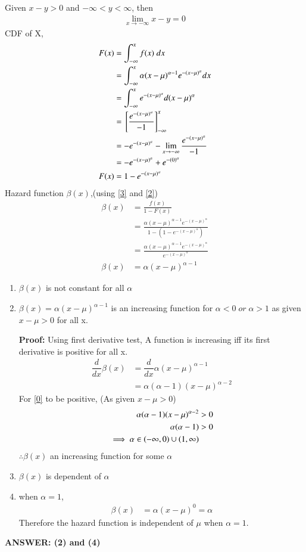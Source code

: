 \documentclass[journal,12pt,twocolumn]{IEEEtran}
\begin{document}
Given $x-y>0$ and $-\infty<y<\infty$, then
\begin{align}
    \lim_{x \to -\infty} x-y=0
\end{align}
CDF of X,
\begin{align}
    F(x)&=\int_{-\infty}^x{f(x)\;dx}\\
    &=\int_{-\infty}^x{\alpha(x-\mu)^{\alpha-1}e^{-(x-\mu)^{\alpha}}dx}\\
    &=\int_{-\infty}^x{e^{-(x-\mu)^{\alpha}}d(x-\mu)^{\alpha}}\\
    &={}\left[\frac{e^{-(x-\mu)^{\alpha}}}{-1}\right]_{-\infty}^x\\
    &=-e^{-(x-\mu)^{\alpha}}-\lim_{x \to -\infty} \frac{e^{-(x-\mu)^{\alpha}}}{-1}\label{1}\\
    &=-e^{-(x-\mu)^{\alpha}}+ {e^{-(0)^{\alpha}}}\\
   F(x) &=1-e^{-(x-\mu)^{\alpha}}\label{2}
\end{align}
Hazard function $\beta(x)$,(using \eqref{3} and \eqref{2})
\begin{align}
    \beta(x)&=\frac{f(x)}{1-F(x)}\\
    &=\frac{\alpha(x-\mu)^{\alpha-1}e^{-(x-\mu)^{\alpha}}}{1-(1-e^{-(x-\mu)^{\alpha}})}\\
    &=\frac{\alpha(x-\mu)^{\alpha-1}e^{-(x-\mu)^{\alpha}}}{e^{-(x-\mu)^{\alpha}}}\\
    \beta(x)&=\alpha(x-\mu)^{\alpha-1}
\end{align}
\begin{enumerate}
    \item $\beta(x)$ is not constant for all $\alpha$
    \item $\beta(x)=\alpha(x-\mu)^{\alpha-1}$ is an increasing function for $\alpha<0 \;or\; \alpha>1$ as given $x-\mu>0$ for all x.
    
    \textbf{Proof: }
    Using first derivative test, A function is increasing iff its first derivative is positive for all x. 
    \begin{align}
        \dfrac{d}{dx} \beta(x)&=  \dfrac{d}{dx} \alpha(x-\mu)^{\alpha-1}\\
        &= \alpha(\alpha-1)(x-\mu)^{\alpha-2}\label{0}
    \end{align}
    For \eqref{0} to be positive, (As given $x-\mu>0$)
    \begin{align}
        \alpha(\alpha-1)(x-\mu)^{\alpha-2}&>0\\
        \alpha(\alpha-1)&>0\\
        \implies \alpha \in \left(-\infty,0\right)\cup \left(1,\infty\right)
    \end{align}
    $\therefore \beta(x)$ an increasing function for some $\alpha$
    \item $\beta(x)$ is dependent of $\alpha$
    \item when $\alpha=1$,
\begin{align}
    \beta(x)&=\alpha(x-\mu)^{0}=\alpha
\end{align}
Therefore the hazard function is independent of $\mu$ when $\alpha=1$.
\end{enumerate}
\textbf{ANSWER: (2) and (4)}
\end{document}
